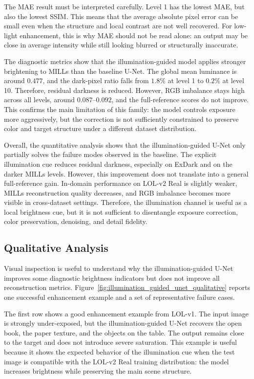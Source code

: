The MAE result must be interpreted carefully. Level 1 has the lowest MAE, but also the lowest SSIM. This means that the average absolute pixel error can be small even when the structure and local contrast are not well recovered. For low-light enhancement, this is why MAE should not be read alone: an output may be close in average intensity while still looking blurred or structurally inaccurate.

The diagnostic metrics show that the illumination-guided model applies stronger brightening to MILLs than the baseline U-Net. The global mean luminance is around $0.477$, and the dark-pixel ratio falls from $1.8\%$ at level 1 to $0.2\%$ at level 10. Therefore, residual darkness is reduced. However, RGB imbalance stays high across all levels, around $0.087$--$0.092$, and the full-reference scores do not improve. This confirms the main limitation of this family: the model controls exposure more aggressively, but the correction is not sufficiently constrained to preserve color and target structure under a different dataset distribution.

Overall, the quantitative analysis shows that the illumination-guided U-Net only partially solves the failure modes observed in the baseline. The explicit illumination cue reduces residual darkness, especially on ExDark and on the darker MILLs levels. However, this improvement does not translate into a general full-reference gain. In-domain performance on LOL-v2 Real is slightly weaker, MILLs reconstruction quality decreases, and RGB imbalance becomes more visible in cross-dataset settings. Therefore, the illumination channel is useful as a local brightness cue, but it is not sufficient to disentangle exposure correction, color preservation, denoising, and detail fidelity.

\subsection{Qualitative Analysis}

Visual inspection is useful to understand why the illumination-guided U-Net improves some diagnostic brightness indicators but does not improve all reconstruction metrics. Figure~\ref{fig:illumination_guided_unet_qualitative} reports one successful enhancement example and a set of representative failure cases.



The first row shows a good enhancement example from LOL-v1. The input image is strongly under-exposed, but the illumination-guided U-Net recovers the open book, the paper texture, and the objects on the table. The output remains close to the target and does not introduce severe saturation. This example is useful because it shows the expected behavior of the illumination cue when the test image is compatible with the LOL-v2 Real training distribution: the model increases brightness while preserving the main scene structure.

